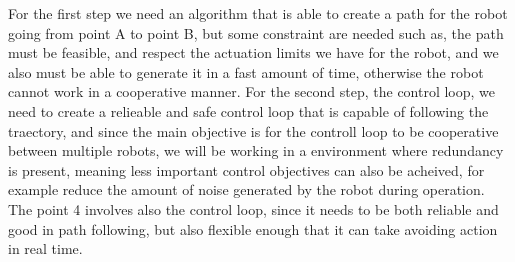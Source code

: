 For the first step we need an algorithm that is able to create a path for the robot going from point A to point B, but some constraint are needed such as, the path must be feasible, and respect the actuation limits we have for the robot, and we also must be able to generate it in a fast amount of time, otherwise the robot cannot work in a cooperative manner. For the second step, the control loop, we need to create a relieable and safe control loop that is capable of following the traectory, and since the main objective is for the controll loop to be cooperative between multiple robots, we will be working in a environment where redundancy is present, meaning less important control objectives can also be acheived, for example reduce the amount of noise generated by the robot during operation. The point 4 involves also the control loop, since it needs to be both reliable and good in path following, but also flexible enough that it can take avoiding action in real time.  


